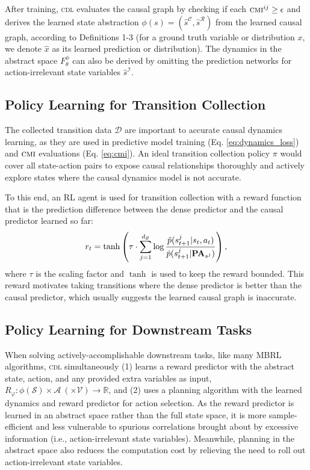 After training, \textsc{cdl} evaluates the causal graph by checking if each $\textsc{cmi}^{ij} \ge \epsilon$ and derives the learned state abstraction $\phi(s) = (\hat{s}^\mathcal{C}, \hat{s}^\mathcal{R})$ from the learned causal graph, according to Definitions 1-3 (for a ground truth variable or distribution $x$, we denote $\hat{x}$ as its learned prediction or distribution). The dynamics in the abstract space $F^\phi_\theta$ can also be derived by omitting the prediction networks for action-irrelevant state variables $\hat{s}^\mathcal{I}$.

\subsection{Policy Learning for Transition Collection}

The collected transition data $\mathcal{D}$ are important to accurate causal dynamics learning, as they are used in predictive model training (Eq. \ref{eq:dynamics_loss}) and $\textsc{cmi}$ evaluations (Eq. \ref{eq:cmi}). An ideal transition collection policy $\pi$ would cover all state-action pairs to expose causal relationships thoroughly and actively explore states where the causal dynamics model is not accurate.

To this end, an RL agent is used for transition collection with a reward function that is the prediction difference between the dense predictor and the causal predictor learned so far:
\begin{align}
\label{eq:policy_reward}
r_t = \tanh \left(\tau \cdot \sum\limits_{j=1}^{d_\mathcal{S}} \log \frac{\hat{p}(s^j_{t+1} | s_t, a_t)}{\hat{p}(s^j_{t+1} | \textbf{PA}_{s^j})}\right),
\end{align}
where $\tau$ is the scaling factor and $\tanh$ is used to keep the reward bounded. This reward motivates taking transitions where the dense predictor is better than the causal predictor, which usually suggests the learned causal graph is inaccurate. 

\subsection{Policy Learning for Downstream Tasks}
\label{subsec:task_learning}

When solving actively-accomplishable downstream tasks, like many MBRL algorithms, \textsc{cdl} simultaneously (1) learns a reward predictor with the abstract state, action, and any provided extra variables as input, $R_\varphi: \phi(\mathcal{S}) \times \mathcal{A} \ (\times \mathcal{V}) \rightarrow \mathbb{R}$, and (2) uses a planning algorithm with the learned dynamics and reward predictor for action selection. As the reward predictor is learned in an abstract space rather than the full state space, it is more sample-efficient and less vulnerable to spurious correlations brought about by excessive information (i.e., action-irrelevant state variables). Meanwhile, planning in the abstract space also reduces the computation cost by relieving the need to roll out action-irrelevant state variables.

